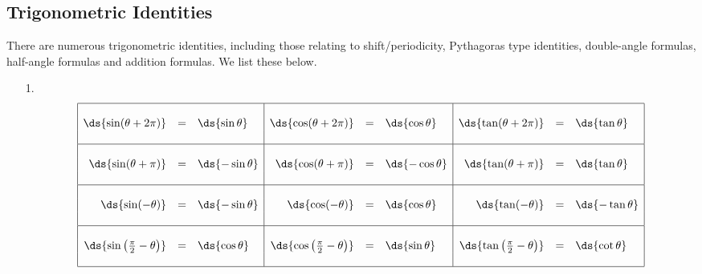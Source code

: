\subsection{Trigonometric Identities}
There are numerous trigonometric identities, including those relating to shift/periodicity, Pythagoras type identities, double-angle formulas, half-angle formulas and addition formulas.
We list these below.

\begin{enumerate}
\item[1.] 
$$\begin{array}{|rcl|rcl|rcl|}
\hline
~&~&~&~&~&~&~&~&~\\
\ds{\sin (\theta + 2\pi)} & = & \ds{\sin \theta} &
\ds{\cos (\theta + 2\pi)} &= & \ds{\cos \theta} &
\ds{\tan (\theta + 2\pi)} &= & \ds{\tan \theta} \\
~&~&~&~&~&~&~&~&~\\
\hline
~&~&~&~&~&~&~&~&~\\
\ds{\sin (\theta + \pi)} &= & \ds{-\sin \theta} &
\ds{\cos (\theta + \pi)} &= & \ds{-\cos \theta} &
\ds{\tan (\theta + \pi)} &= & \ds{\tan \theta} \\
~&~&~&~&~&~&~&~&~\\
\hline
~&~&~&~&~&~&~&~&~\\
\ds{\sin (-\theta)} &= & \ds{-\sin \theta} & 
\ds{\cos (-\theta)} &= & \ds{\cos \theta} & 
\ds{\tan (-\theta)} &= & \ds{-\tan \theta}  \\
~&~&~&~&~&~&~&~&~\\
\hline
~&~&~&~&~&~&~&~&~\\
\ds{\sin \left(\frac{\pi}{2}-\theta\right)} &=&  \ds{\cos \theta} &
\ds{\cos \left(\frac{\pi}{2}-\theta\right)} &=&  \ds{\sin \theta} &
\ds{\tan \left(\frac{\pi}{2}-\theta\right)} &= & \ds{\cot \theta}\\
~&~&~&~&~&~&~&~&~\\
\hline
\end{array}$$
\end{enumerate}

